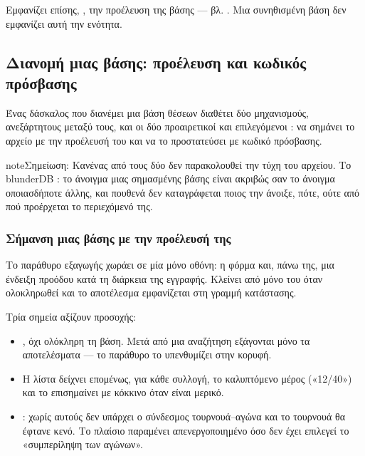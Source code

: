 \documentclass[letterpaper,10pt,greek]{sphinxmanual}
\begin{document}
\sphinxAtStartPar
Εμφανίζει επίσης, , την προέλευση της βάσης — βλ. {\hyperref[\detokenize{manuel:diffusion-controlee}]{}}. Μια συνηθισμένη βάση δεν εμφανίζει αυτή την ενότητα.


\subsection{Διανομή μιας βάσης: προέλευση και κωδικός πρόσβασης}
\label{\detokenize{manuel:diffuser-une-base-origine-et-mot-de-passe}}\label{\detokenize{manuel:diffusion-controlee}}
\sphinxAtStartPar
Ένας δάσκαλος που διανέμει μια βάση θέσεων διαθέτει δύο μηχανισμούς, ανεξάρτητους μεταξύ τους, και οι δύο προαιρετικοί και επιλεγόμενοι : να σημάνει το αρχείο με την προέλευσή του και να το προστατεύσει με κωδικό πρόσβασης.

\begin{sphinxadmonition}{note}{Σημείωση:}
\sphinxAtStartPar
Κανένας από τους δύο δεν παρακολουθεί την τύχη του αρχείου. Το blunderDB : το άνοιγμα μιας σημασμένης βάσης είναι ακριβώς σαν το άνοιγμα οποιασδήποτε άλλης, και πουθενά δεν καταγράφεται ποιος την άνοιξε, πότε, ούτε από πού προέρχεται το περιεχόμενό της.
\end{sphinxadmonition}


\subsubsection{Σήμανση μιας βάσης με την προέλευσή της}
\label{\detokenize{manuel:marquer-une-base-de-son-origine}}
\sphinxAtStartPar
Το παράθυρο εξαγωγής χωράει σε μία μόνο οθόνη: η φόρμα και, πάνω της, μια ένδειξη προόδου κατά τη διάρκεια της εγγραφής. Κλείνει από μόνο του όταν ολοκληρωθεί και το αποτέλεσμα εμφανίζεται στη γραμμή κατάστασης.

\sphinxAtStartPar
Τρία σημεία αξίζουν προσοχής:
\begin{itemize}
\item {} 
\sphinxAtStartPar
{}, όχι ολόκληρη τη βάση. Μετά από μια αναζήτηση εξάγονται μόνο τα αποτελέσματα — το παράθυρο το υπενθυμίζει στην κορυφή.

\item {} 
\sphinxAtStartPar
{} Η λίστα δείχνει επομένως, για κάθε συλλογή, το καλυπτόμενο μέρος («12/40») και το επισημαίνει με κόκκινο όταν είναι μερικό.

\item {} 
\sphinxAtStartPar
{}: χωρίς αυτούς δεν υπάρχει ο σύνδεσμος τουρνουά–αγώνα και το τουρνουά θα έφτανε κενό. Το πλαίσιο παραμένει απενεργοποιημένο όσο δεν έχει επιλεγεί το «συμπερίληψη των αγώνων».

\end{itemize}
\end{document}
